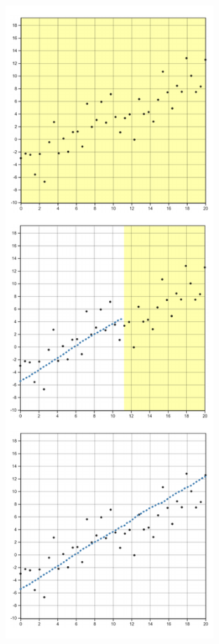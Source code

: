 \documentclass[
]{jds}
\providecommand{\DIFaddbeginFL}{} %
\providecommand{\DIFaddendFL}{} %
\providecommand{\DIFdelbeginFL}{} %
\providecommand{\DIFdelendFL}{} %
\newcommand{\DIFscaledelfig}{0.5}
\newlength{\DIFdelgraphicswidth} %
\newlength{\DIFdelgraphicsheight} %
\newcommand{\DIFaddincludegraphics}[2][]{{\color{blue}\fbox{\DIFOincludegraphics[#1]{#2}}}} %
\newcommand{\DIFdelincludegraphics}[2][]{%
\sbox{\DIFdelgraphicsbox}{\DIFOincludegraphics[#1]{#2}}%
\settoboxwidth{\DIFdelgraphicswidth}{\DIFdelgraphicsbox} %
\settoboxtotalheight{\DIFdelgraphicsheight}{\DIFdelgraphicsbox} %
\scalebox{\DIFscaledelfig}{%
\parbox[b]{\DIFdelgraphicswidth}{\usebox{\DIFdelgraphicsbox}\\[-\baselineskip] \rule{\DIFdelgraphicswidth}{0em}}\llap{\resizebox{\DIFdelgraphicswidth}{\DIFdelgraphicsheight}{%
\setlength{\unitlength}{\DIFdelgraphicswidth}%
\begin{picture}(1,1)%
\thicklines\linethickness{2pt} %
{\color[rgb]{1,0,0}\put(0,0){\framebox(1,1){}}}%
{\color[rgb]{1,0,0}\put(0,0){\line( 1,1){1}}}%
{\color[rgb]{1,0,0}\put(0,1){\line(1,-1){1}}}%
\end{picture}%
}\hspace*{3pt}}} %
} %
\DeclareRobustCommand{\DIFaddbeginFL}{\DIFOaddbeginFL \let\includegraphics\DIFaddincludegraphics} %
\DeclareRobustCommand{\DIFaddendFL}{\DIFOaddendFL \let\includegraphics\DIFOincludegraphics} %
\DeclareRobustCommand{\DIFdelbeginFL}{\DIFOdelbeginFL \let\includegraphics\DIFdelincludegraphics} %
\DeclareRobustCommand{\DIFdelendFL}{\DIFOaddendFL \let\includegraphics\DIFOincludegraphics} %
\begin{document}
\begin{figure}

{\centering \DIFdelbeginFL %
\DIFdelendFL \DIFaddbeginFL \includegraphics[width=0.7\textwidth,height=\textheight]{./images/fig-you-draw-it-task-plot-1.pdf}
\DIFaddendFL 

}
\end{figure}
\end{document}
